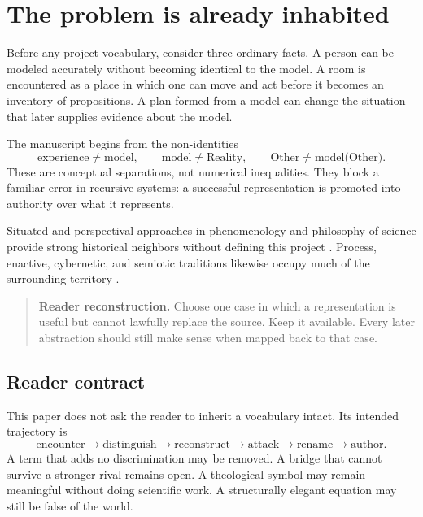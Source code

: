 \documentclass[11pt]{article}
\newenvironment{readercheck}{\begin{quote}\small\noindent\textbf{Reader reconstruction.}\;}{\end{quote}}
\begin{document}
\section{The problem is already inhabited}

Before any project vocabulary, consider three ordinary facts. A person can be modeled accurately without becoming identical to the model. A room is encountered as a place in which one can move and act before it becomes an inventory of propositions. A plan formed from a model can change the situation that later supplies evidence about the model.

The manuscript begins from the non-identities
\begin{equation}
\text{experience}\neq\text{model},\qquad
\text{model}\neq\text{Reality},\qquad
\text{Other}\neq\text{model(Other)}.
\end{equation}
These are conceptual separations, not numerical inequalities. They block a familiar error in recursive systems: a successful representation is promoted into authority over what it represents.

Situated and perspectival approaches in phenomenology and philosophy of science provide strong historical neighbors without defining this project \cite{Heidegger2026BeingTime,SEPHeidegger2025,Massimi2022Perspectival}. Process, enactive, cybernetic, and semiotic traditions likewise occupy much of the surrounding territory \cite{Whitehead1978Process,MaturanaVarela1980Autopoiesis,VonFoerster2003Understanding,PeirceSemioticsSEP}.

\begin{readercheck}
Choose one case in which a representation is useful but cannot lawfully replace the source. Keep it available. Every later abstraction should still make sense when mapped back to that case.
\end{readercheck}

\subsection{Reader contract}

This paper does not ask the reader to inherit a vocabulary intact. Its intended trajectory is
\begin{equation}
\text{encounter}\rightarrow\text{distinguish}\rightarrow\text{reconstruct}
\rightarrow\text{attack}\rightarrow\text{rename}\rightarrow\text{author}.
\end{equation}
A term that adds no discrimination may be removed. A bridge that cannot survive a stronger rival remains open. A theological symbol may remain meaningful without doing scientific work. A structurally elegant equation may still be false of the world.
\end{document}
